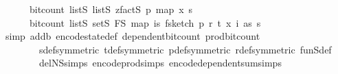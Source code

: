 \begin{isabellebody}
\ \ \ \ \ \ bit{\isacharunderscore}{\kern0pt}count\ {\isacharparenleft}{\kern0pt}list\isactrlsub S\ {\isacharparenleft}{\kern0pt}list\isactrlsub S\ {\isacharparenleft}{\kern0pt}zfact\isactrlsub S\ p{\isacharparenright}{\kern0pt}{\isacharparenright}{\kern0pt}\ {\isacharparenleft}{\kern0pt}map\ x\ {\isacharbrackleft}{\kern0pt}{}{\isachardot}{\kern0pt}{\isachardot}{\kern0pt}{\isacharless}{\kern0pt}s{\isacharbrackright}{\kern0pt}{\isacharparenright}{\kern0pt}{\isacharparenright}{\kern0pt}\ {\isacharplus}{\kern0pt}\isanewline
\ \ \ \ \ \ bit{\isacharunderscore}{\kern0pt}count\ {\isacharparenleft}{\kern0pt}list\isactrlsub S\ {\isacharparenleft}{\kern0pt}set\isactrlsub S\ F\isactrlsub S{\isacharparenright}{\kern0pt}\ {\isacharparenleft}{\kern0pt}map\ {\isacharparenleft}{\kern0pt}{\isasymlambda}i{\isasymin}{\isacharbraceleft}{\kern0pt}{}{\isachardot}{\kern0pt}{\isachardot}{\kern0pt}{\isacharless}{\kern0pt}s{\isacharbraceright}{\kern0pt}{\isachardot}{\kern0pt}\ f{}{\isacharunderscore}{\kern0pt}sketch\ p\ r\ t\ {\isacharparenleft}{\kern0pt}x\ i{\isacharparenright}{\kern0pt}\ as{\isacharparenright}{\kern0pt}\ {\isacharbrackleft}{\kern0pt}{}{\isachardot}{\kern0pt}{\isachardot}{\kern0pt}{\isacharless}{\kern0pt}s{\isacharbrackright}{\kern0pt}{\isacharparenright}{\kern0pt}{\isacharparenright}{\kern0pt}{\isachardoublequoteclose}\isanewline
\ \ \ \ \ \ \isamarkupfalse%
\ {\isacharparenleft}{\kern0pt}simp\ add{\isacharcolon}{\kern0pt}b{\isacharunderscore}{\kern0pt}{}\ encode{\isacharunderscore}{\kern0pt}state{\isacharunderscore}{\kern0pt}def\ dependent{\isacharunderscore}{\kern0pt}bit{\isacharunderscore}{\kern0pt}count\ prod{\isacharunderscore}{\kern0pt}bit{\isacharunderscore}{\kern0pt}count\isanewline
\ \ \ \ \ \ \ \ s{\isacharunderscore}{\kern0pt}def{\isacharbrackleft}{\kern0pt}symmetric{\isacharbrackright}{\kern0pt}\ t{\isacharunderscore}{\kern0pt}def{\isacharbrackleft}{\kern0pt}symmetric{\isacharbrackright}{\kern0pt}\ p{\isacharunderscore}{\kern0pt}def{\isacharbrackleft}{\kern0pt}symmetric{\isacharbrackright}{\kern0pt}\ r{\isacharunderscore}{\kern0pt}def{\isacharbrackleft}{\kern0pt}symmetric{\isacharbrackright}{\kern0pt}\ fun\isactrlsub S{\isacharunderscore}{\kern0pt}def\isanewline
\ \ \ \ \ \ \ \ del{\isacharcolon}{\kern0pt}N\isactrlsub S{\isachardot}{\kern0pt}simps\ encode{\isacharunderscore}{\kern0pt}prod{\isachardot}{\kern0pt}simps\ encode{\isacharunderscore}{\kern0pt}dependent{\isacharunderscore}{\kern0pt}sum{\isachardot}{\kern0pt}simps{\isacharparenright}{\kern0pt}\isanewline
\ \ \ \ \ \ \isamarkupfalse%

\end{isabellebody}
